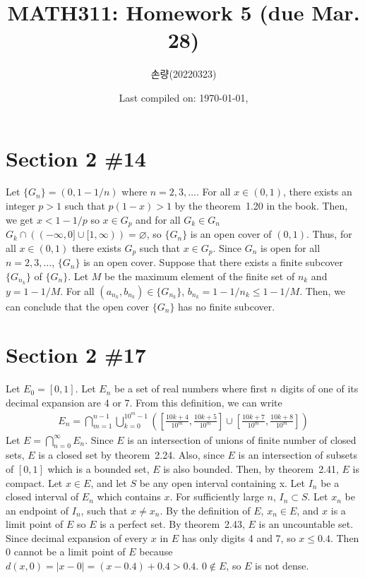 \documentclass{scrartcl}
\title{MATH311: Homework 5 (due Mar. 28)}
\author{손량(20220323)}
\date{Last compiled on: \today, \currenttime}
\begin{document}
\maketitle

\section{Section 2 \#14}
Let \(\{G_n\} = (0, 1 - 1 / n)\) where \(n = 2, 3, \dots\).
For all \(x \in (0, 1)\), there exists an integer \(p > 1\) such that \(p(1 - x) > 1\) by the theorem~1.20 in the book.
Then, we get \(x < 1 - 1 / p\) so \(x \in G_p\) and for all \(G_k \in G_n\) \(G_k \cap ((-\infty, 0] \cup [1, \infty)) = \varnothing\), so \(\{G_n\}\) is an open cover of \((0, 1)\).
Thus, for all \(x \in (0, 1)\) there exists \(G_p\) such that \(x \in G_p\).
Since \(G_n\) is open for all \(n = 2, 3, \dots\), \(\{G_n\}\) is an open cover.
Suppose that there exists a finite subcover \(\{G_{n_k}\}\) of \(\{G_n\}\).
Let \(M\) be the maximum element of the finite set of \(n_k\) and \(y = 1 - 1 / M\).
For all \((a_{n_k}, b_{n_k}) \in \{G_{n_k}\}\), \(b_{n_k} = 1 - 1 / n_k \leq 1 - 1 / M\).
Then, we can conclude that the open cover \(\{G_n\}\) has no finite subcover.

\section{Section 2 \#17}
Let \(E_0 = [0, 1]\).
Let \(E_n\) be a set of real numbers where first \(n\) digits of one of its decimal expansion are 4 or 7.
From this definition, we can write
\begin{align*}
  E_n = \bigcap^{n - 1}_{m = 1} \bigcup^{10^m - 1}_{k = 0} \left( \left[ \frac{10k + 4}{10^m}, \frac{10k + 5}{10^m} \right] \cup \left[ \frac{10k + 7}{10^m}, \frac{10k + 8}{10^m} \right] \right)
\end{align*}
Let \(E = \bigcap^\infty_{n = 0} E_n\).
Since \(E\) is an intersection of unions of finite number of closed sets, \(E\) is a closed set by theorem~2.24.
Also, since \(E\) is an intersection of subsets of \([0, 1]\) which is a bounded set, \(E\) is also bounded.
Then, by theorem~2.41, \(E\) is compact.
Let \(x \in E\), and let \(S\) be any open interval containing x. Let \(I_n\) be a closed interval of \(E_n\) which contains \(x\).
For sufficiently large \(n\), \(I_n \subset S\).
Let \(x_n\) be an endpoint of \(I_n\), such that \(x \not = x_n\).
By the definition of \(E\), \(x_n \in E\), and \(x\) is a limit point of \(E\) so \(E\) is a perfect set.
By theorem~2.43, \(E\) is an uncountable set.
Since decimal expansion of every \(x\) in \(E\) has only digits 4 and 7, so \(x \leq 0.4\).
Then 0 cannot be a limit point of \(E\) because \(d(x, 0) = |x - 0| = (x - 0.4) + 0.4 > 0.4\).
\(0 \not \in E\), so \(E\) is not dense.
\end{document}
